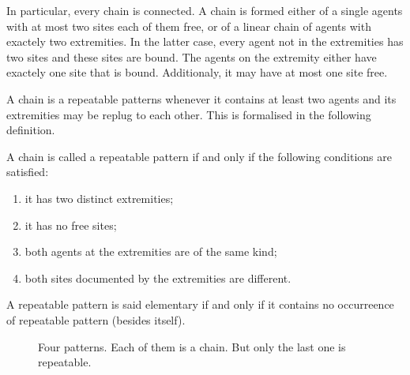 \documentclass{entcs}
\begin{document}
In particular, every chain is connected.
A chain is formed either of a single agents with at most two sites each of them free, or of a linear chain of agents with exactely two extremities. In the latter case, every agent not in the extremities has two sites and these sites are bound. The agents on the extremity either have exactely one site that is bound. Additionaly, it may have at most one site free.

A chain is a repeatable patterns whenever it contains at least two agents and its extremities may be replug to each other. This is formalised in the following definition.

\begin{defn}
A chain is called a repeatable pattern if and only if the following conditions are satisfied:
\begin{enumerate}
\item it has two distinct extremities;
\item it has no free sites;
\item both agents at the extremities are of the same kind;
\item both sites documented by the extremities are different.
\end{enumerate}
A repeatable pattern is said elementary if and only if it contains no occurreence of repeatable pattern (besides itself).
\end{defn}

\begin{figure}[t]
%
%

%
\caption{Four patterns. Each of them is a chain. But only the last one is repeatable.}
\label{fig:repeatable}
\end{figure}
\end{document}
